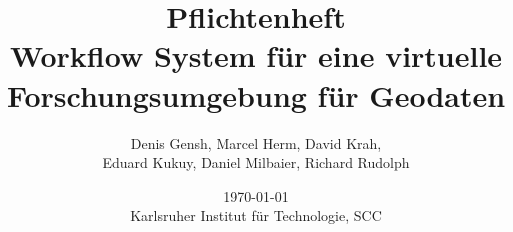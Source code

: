 \documentclass[oneside]{scrbook}
\title{
    \vspace{-3.5cm}
    \Huge {\textbf{Pflichtenheft}}\\
    \vspace{2cm}
    \Large{\textbf{Workflow System für eine virtuelle Forschungsumgebung für Geodaten}}\\
    \vspace{1cm}
}
\author{
    Denis Gensh, Marcel Herm, David Krah,\\
    Eduard Kukuy, Daniel Milbaier, Richard Rudolph\\
} %
\date{
    \today\\
    \vspace{1cm}
    Karlsruher Institut für Technologie, SCC\\
}
\begin{document}
    
    
    
    
    
    
    
    
    
    
    
    
    
    
    
    
    
    
    
    
    
    
    \printglossaries
    
\end{document}
